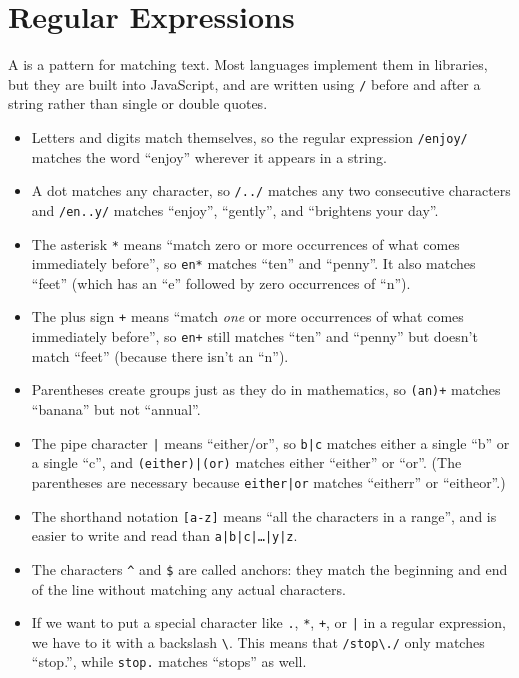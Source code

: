 \chapter{Regular Expressions}\label{s:regexp}

A  is a pattern for matching text.
Most languages implement them in libraries,
but they are built into JavaScript,
and are written using \texttt{/} before and after a string rather than single or double quotes.

\begin{itemize}

\item
  Letters and digits match themselves,
  so the regular expression \texttt{/enjoy/} matches the word ``enjoy'' wherever it appears in a string.

\item
  A dot matches any character,
  so \texttt{/../} matches any two consecutive characters
  and \texttt{/en..y/} matches ``enjoy'', ``gently'', and ``brightens your day''.

\item
  The asterisk \texttt{*} means ``match zero or more occurrences of what comes immediately before'',
  so \texttt{en*} matches ``ten'' and ``penny''.
  It also matches ``feet'' (which has an ``e'' followed by zero occurrences of ``n'').

\item
  The plus sign \texttt{+} means ``match \emph{one} or more occurrences of what comes immediately before'',
  so \texttt{en+} still matches ``ten'' and ``penny'' but doesn't match ``feet''
  (because there isn't an ``n'').

\item
  Parentheses create groups just as they do in mathematics,
  so \texttt{(an)+} matches ``banana'' but not ``annual''.

\item
  The pipe character \texttt{|} means ``either/or'',
  so \texttt{b|c} matches either a single ``b'' or a single ``c'',
  and \texttt{(either)|(or)} matches either ``either'' or ``or''.
  (The parentheses are necessary because \texttt{either|or} matches ``eitherr'' or ``eitheor''.)

\item
  The shorthand notation \texttt{[a-z]} means ``all the characters in a range'',
  and is easier to write and read than \texttt{a|b|c|{\ldots}|y|z}.

\item
  The characters \texttt{\textasciicircum} and \texttt{\$} are called anchors:
  they match the beginning and end of the line without matching any actual characters.
  
\item
  If we want to put a special character like \texttt{.}, \texttt{*}, \texttt{+}, or \texttt{|}
  in a regular expression,
  we have to  it with a backslash \texttt{\textbackslash}.
  This means that \texttt{/stop{\textbackslash}./} only matches ``stop.'',
  while \texttt{stop.} matches ``stops'' as well.
  
\end{itemize}

